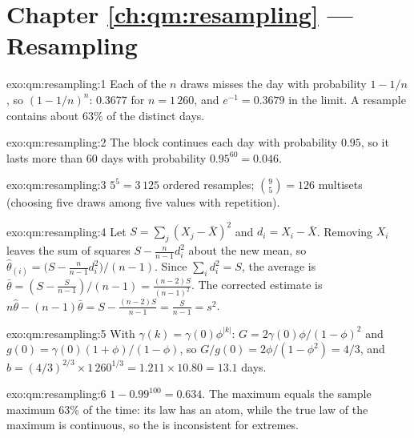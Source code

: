 \section*{Chapter \ref{ch:qm:resampling} --- Resampling}

\begin{solution}{exo:qm:resampling:1}
Each of the $n$ draws misses the day with probability $1 - 1/n$, so $(1 - 1/n)^n$: 0.3677 for $n = 1\,260$, and $e^{-1} = 0.3679$ in the
limit. A resample contains about 63\% of the distinct days.
\end{solution}

\begin{solution}{exo:qm:resampling:2}
The block continues each day with probability $0.95$, so it lasts more than 60 days with probability $0.95^{60} = 0.046$.
\end{solution}

\begin{solution}{exo:qm:resampling:3}
$5^5 = 3\,125$ ordered resamples; $\binom{9}{5} = 126$ multisets (choosing five draws among five values with repetition).
\end{solution}

\begin{solution}{exo:qm:resampling:4}
Let $S = \sum_j(X_j - \bar X)^2$ and $d_i = X_i - \bar X$. Removing $X_i$ leaves the sum of squares $S - \frac{n}{n-1}d_i^2$ about the new
mean, so $\hat\theta_{(i)} = \bigl(S - \frac{n}{n-1}d_i^2\bigr)/(n - 1)$. Since $\sum_i d_i^2 = S$, the average is $\bar\theta = (S - \frac{S}{n-1})/(n
- 1) = \frac{(n-2)S}{(n-1)^2}$. The corrected estimate is $n\hat\theta - (n - 1)\bar\theta = S - \frac{(n-2)S}{n-1} = \frac{S}{n-1} = s^2$.
\end{solution}

\begin{solution}{exo:qm:resampling:5}
With $\gamma(k) = \gamma(0)\phi^{|k|}$: $G = 2\gamma(0)\phi/(1 - \phi)^2$ and $g(0) = \gamma(0)(1 + \phi)/(1 - \phi)$, so $G/g(0) = 2\phi/(1 -
\phi^2) = 4/3$, and $b = (4/3)^{2/3} \times 1\,260^{1/3} = 1.211 \times 10.80 = 13.1$ days.
\end{solution}

\begin{solution}{exo:qm:resampling:6}
$1 - 0.99^{100} = 0.634$. The  maximum equals the sample maximum 63\% of the time: its law has an atom, while the true law of the
maximum is continuous, so the  is inconsistent for extremes.
\end{solution}

